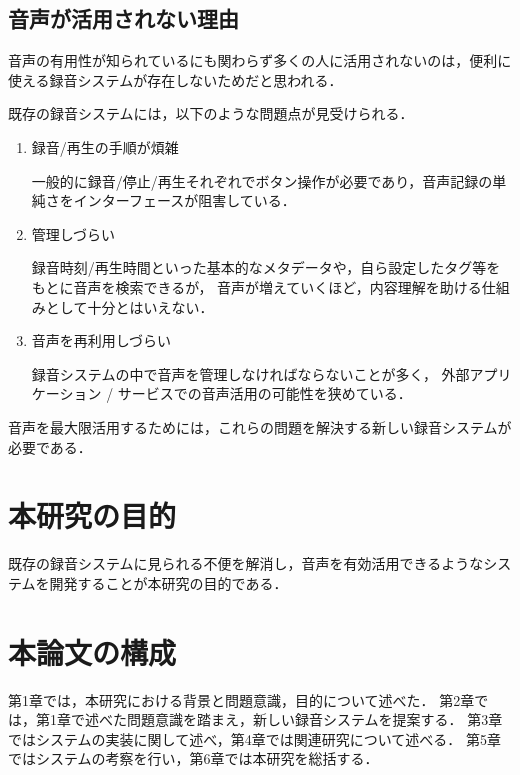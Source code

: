 \subsection{音声が活用されない理由}

音声の有用性が知られているにも関わらず多くの人に活用されないのは，便利に使える録音システムが存在しないためだと思われる．

既存の録音システムには，以下のような問題点が見受けられる．

\begin{enumerate}
\item 録音/再生の手順が煩雑

一般的に録音/停止/再生それぞれでボタン操作が必要であり，音声記録の単純さをインターフェースが阻害している．

\item 管理しづらい

録音時刻/再生時間といった基本的なメタデータや，自ら設定したタグ等をもとに音声を検索できるが，
音声が増えていくほど，内容理解を助ける仕組みとして十分とはいえない．

\item 音声を再利用しづらい

録音システムの中で音声を管理しなければならないことが多く，
外部アプリケーション / サービスでの音声活用の可能性を狭めている．

\end{enumerate}

音声を最大限活用するためには，これらの問題を解決する新しい録音システムが必要である．

\section{本研究の目的}

既存の録音システムに見られる不便を解消し，音声を有効活用できるようなシステムを開発することが本研究の目的である．

\section{本論文の構成}

第1章では，本研究における背景と問題意識，目的について述べた．
第2章では，第1章で述べた問題意識を踏まえ，新しい録音システムを提案する．
第3章ではシステムの実装に関して述べ，第4章では関連研究について述べる．
第5章ではシステムの考察を行い，第6章では本研究を総括する．